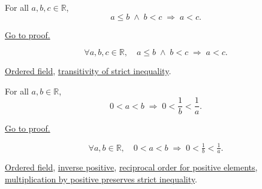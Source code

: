 \begin{theorem}
\label{thm:ineq-transitivity-mixed}
For all $a, b, c \in \mathbb{R}$,
\[
  a \le b \;\land\; b < c \;\Rightarrow\; a < c.
\]
\end{theorem}



\begin{remark*}[Proof]
\hyperref[prf:ineq-transitivity-mixed]{Go to proof.}
\end{remark*}

\begin{remark*}
\[
  \forall a, b, c \in \mathbb{R},\quad
  a \le b \;\land\; b < c \;\Rightarrow\; a < c.
\]
\end{remark*}

\begin{dependencies}
\hyperref[def:real-ordered-field]{Ordered field},
\hyperref[thm:ineq-transitivity-strict]{transitivity of strict inequality}.
\end{dependencies}


\begin{theorem}
\label{thm:ineq-reciprocal-positive}
For all $a, b \in \mathbb{R}$,
\[
  0 < a < b \;\Rightarrow\; 0 < \frac{1}{b} < \frac{1}{a}.
\]
\end{theorem}



\begin{remark*}[Proof]
\hyperref[prf:ineq-reciprocal-positive]{Go to proof.}
\end{remark*}

\begin{remark*}
\[
  \forall a, b \in \mathbb{R},\quad
  0 < a < b \;\Rightarrow\;
  0 < \tfrac{1}{b} < \tfrac{1}{a}.
\]
\end{remark*}

\begin{dependencies}
\hyperref[def:real-ordered-field]{Ordered field},
\hyperref[thm:reciprocal-reverses-order-on-positives-q]{inverse positive},
\hyperref[thm:reciprocal-reverses-order-on-positives-q]{reciprocal order for positive elements},
\hyperref[thm:ineq-multiply-positive]{multiplication by positive preserves strict inequality}.
\end{dependencies}

